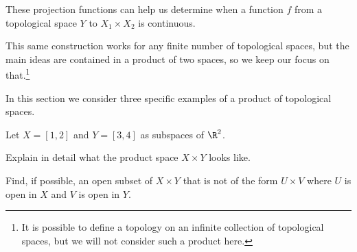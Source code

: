 These projection functions can help us determine when a function $f$ from a topological space $Y$ to $X_1 \times X_2$ is continuous.



This same construction works for any finite number of topological spaces, but the main ideas are contained in a product of two spaces, so we keep our focus on that.\footnote{It is possible to define a topology on an infinite collection of topological spaces, but we will not consider such a product here.}



In this section we consider three specific examples of a product of topological spaces. 

\begin{activity} Let $X = [1,2]$ and $Y = [3,4]$ as subspaces of $\R^2$. 
\ba
\item Explain in detail what the product space $X \times Y$ looks like. 

\item Find, if possible, an open subset of $X \times Y$ that is not of the form $U \times V$ where $U$ is open in $X$ and $V$ is open in $Y$.

\ea

\end{activity}

\begin{comment}

\ActivitySolution

\ba
\item The product space $X \times Y$ contains all points of the form $(x,y)$ with $1 \leq x \leq 2$ and $3 \leq y \leq 4$ in $\R^2$. This set of points is the rectangle in $\R^2$ with vertices $(1,3)$, $(2,3)$, $(1,4)$ and $(2,4)$. 

\item The set $O = \{(x,y) \mid 1.1 < x < 1.3, 3.1 < y < 3.3\} \cup \{(x,y) \mid 1.7< x < 1.9, 3.7 < y < 3.9\}$ is equal to $(B(1.2,0.1) \times B(3.2,0.1)) \cup ((B(1.8,0.1) \times B(3.8,0.1))$ and so is open in $X \times Y$. However, $O$ is not of the form $U \times V$ where $U$ is open in $X$ and $V$ is open in $Y$. To see why, suppose to the contrary that $O = U \times V$ for some $U$ open in $X$ and $V$ open in $Y$. Since the points $(x,y)$ in $O$ only have $x \in (1.1,1.3) \cup (1.7,1.9)$ and $y \in (3.1,3.3) \cup (3.7,3.9)$, it follows that $U = (1,1,1.3) \cup (1.7,1.9)$ and $V = (3.1,3.3) \cup (3.7,3.9)$. But then $(1.8, 3.2)$ is in $U \times V$. Since $(1.8, 3.2)$ is not in $O$, we conclude that $O$ is not of the for $U \times V$ with $U$ open in $X$ and $V$ open in $Y$.  

\ea


\end{comment}



